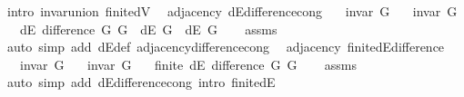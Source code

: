 \begin{isabellebody}
\ {\isacharparenleft}{\kern0pt}intro\ invar{\isacharunderscore}{\kern0pt}union\ finite{\isacharunderscore}{\kern0pt}dV{\isacharparenright}{\kern0pt}%
\endisatagproof
{\isafoldproof}%
%
\isadelimproof
\isanewline
%
\endisadelimproof
\isanewline
{}\isamarkupfalse%
\ {\isacharparenleft}{\kern0pt}\ adjacency{\isacharparenright}{\kern0pt}\ dE{\isacharunderscore}{\kern0pt}difference{\isacharunderscore}{\kern0pt}cong{\isacharcolon}{\kern0pt}\isanewline
\ \ \ {\isachardoublequoteopen}invar\ G{}{\isachardoublequoteclose}\isanewline
\ \ \ {\isachardoublequoteopen}invar\ G{}{\isachardoublequoteclose}\isanewline
\ \ \ {\isachardoublequoteopen}dE\ {\isacharparenleft}{\kern0pt}difference\ G{}\ G{}{\isacharparenright}{\kern0pt}\ {\isacharequal}{\kern0pt}\ dE\ G{}\ {\isacharminus}{\kern0pt}\ dE\ G{}{\isachardoublequoteclose}\isanewline
%
\isadelimproof
\ \ %
\endisadelimproof
%
\isatagproof
{}\isamarkupfalse%
\ assms\isanewline
\ \ \isamarkupfalse%
\ {\isacharparenleft}{\kern0pt}auto\ simp\ add{\isacharcolon}{\kern0pt}\ dE{\isacharunderscore}{\kern0pt}def\ adjacency{\isacharunderscore}{\kern0pt}difference{\isacharunderscore}{\kern0pt}cong{\isacharparenright}{\kern0pt}%
\endisatagproof
{\isafoldproof}%
%
\isadelimproof
\isanewline
%
\endisadelimproof
\isanewline
{}\isamarkupfalse%
\ {\isacharparenleft}{\kern0pt}\ adjacency{\isacharparenright}{\kern0pt}\ finite{\isacharunderscore}{\kern0pt}dE{\isacharunderscore}{\kern0pt}difference{\isacharcolon}{\kern0pt}\isanewline
\ \ \ {\isachardoublequoteopen}invar\ G{}{\isachardoublequoteclose}\isanewline
\ \ \ {\isachardoublequoteopen}invar\ G{}{\isachardoublequoteclose}\isanewline
\ \ \ {\isachardoublequoteopen}finite\ {\isacharparenleft}{\kern0pt}dE\ {\isacharparenleft}{\kern0pt}difference\ G{}\ G{}{\isacharparenright}{\kern0pt}{\isacharparenright}{\kern0pt}{\isachardoublequoteclose}\isanewline
%
\isadelimproof
\ \ %
\endisadelimproof
%
\isatagproof
{}\isamarkupfalse%
\ assms\isanewline
\ \ \isamarkupfalse%
\ {\isacharparenleft}{\kern0pt}auto\ simp\ add{\isacharcolon}{\kern0pt}\ dE{\isacharunderscore}{\kern0pt}difference{\isacharunderscore}{\kern0pt}cong\ intro{\isacharcolon}{\kern0pt}\ finite{\isacharunderscore}{\kern0pt}dE{\isacharparenright}{\kern0pt}%
\endisatagproof
{\isafoldproof}%

\end{isabellebody}

